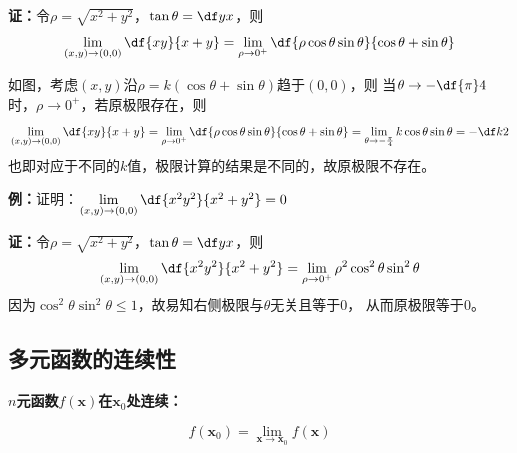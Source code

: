 \begin{shaded}
	{\bf 证：}令$\rho=\sqrt{x^2+y^2}$，$\tan\theta=\df yx$，则
	$$\lim\limits_{(x,y)\to(0,0)}\df{xy}{x+y}
	=\lim\limits_{\rho\to{0^+}}\df{\rho\cos\theta\sin\theta}
	{\cos\theta+\sin\theta}
	$$
	\begin{center}
	\end{center}
	如图，考虑$(x,y)$沿$\rho=k(\cos\theta+\sin\theta)$趋于$(0,0)$，则
	当$\theta\to-\df{\pi}4$时，$\rho\to 0^+$，若原极限存在，则
	$$\lim\limits_{(x,y)\to(0,0)}\df{xy}{x+y}
	=\lim\limits_{\rho\to{0^+}}\df{\rho\cos\theta\sin\theta}
	{\cos\theta+\sin\theta}=\lim\limits_{\theta\to-\frac{\pi}4}
	k\cos\theta\sin\theta=-\df k2$$
	也即对应于不同的$k$值，极限计算的结果是不同的，故原极限不存在。
	
	{\bf 例：}证明：$\lim\limits_{(x,y)\to(0,0)}\df{x^2y^2}{x^2+y^2}=0$
	
	{\bf 证：}令$\rho=\sqrt{x^2+y^2}$，$\tan\theta=\df yx$，则	
	$$\lim\limits_{(x,y)\to(0,0)}\df{x^2y^2}{x^2+y^2}
	=\lim\limits_{\rho\to{0^+}}\rho^2\cos^2\theta\sin^2\theta$$	
	因为$\cos^2\theta\sin^2\theta\leq1$，故易知右侧极限与$\theta$无关且等于$0$，
	从而原极限等于$0$。

\end{shaded}

\subsection{多元函数的连续性}

{\bf $n$元函数$f(\bm{x})$在$\bm{x}_0$处连续：}

$$f(\bm{x}_0)=\lim\limits_{\bm{x}\to\bm{x}_0}f(\bm{x})$$

